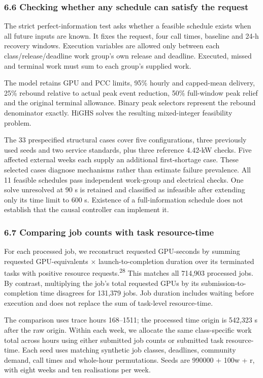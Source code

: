 \documentclass[10pt,a4paper]{article}
\begin{document}
\subsubsection{6.6 Checking whether any schedule can satisfy the request}

The strict perfect-information test asks whether a feasible schedule exists when all future inputs are known. It fixes the request, four call times, baseline and 24-h recovery windows. Execution variables are allowed only between each class/release/deadline work group's own release and deadline. Executed, missed and terminal work must sum to each group's supplied work.


The model retains GPU and PCC limits, 95\% hourly and capped-mean delivery, 25\% rebound relative to actual peak event reduction, 50\% full-window peak relief and the original terminal allowance. Binary peak selectors represent the rebound denominator exactly. HiGHS solves the resulting mixed-integer feasibility problem.


The 33 prespecified structural cases cover five configurations, three previously used seeds and two service standards, plus three reference 4.42-kW checks. Five affected external weeks each supply an additional first-shortage case. These selected cases diagnose mechanisms rather than estimate failure prevalence. All 11 feasible schedules pass independent work-group and electrical checks. One solve unresolved at 90 s is retained and classified as infeasible after extending only its time limit to 600 s. Existence of a full-information schedule does not establish that the causal controller can implement it.


\subsubsection{6.7 Comparing job counts with task resource-time}

For each processed job, we reconstruct requested GPU-seconds by summing requested GPU-equivalents × launch-to-completion duration over its terminated tasks with positive resource requests.\textsuperscript{28} This matches all 714,903 processed jobs. By contrast, multiplying the job's total requested GPUs by its submission-to-completion time disagrees for 131,379 jobs. Job duration includes waiting before execution and does not replace the sum of task-level resource-time.


The comparison uses trace hours 168–1511; the processed time origin is 542,323 s after the raw origin. Within each week, we allocate the same class-specific work total across hours using either submitted job counts or submitted task resource-time. Each seed uses matching synthetic job classes, deadlines, community demand, call times and whole-hour permutations. Seeds are 990000 + 100w + r, with eight weeks and ten realisations per week.
\end{document}

